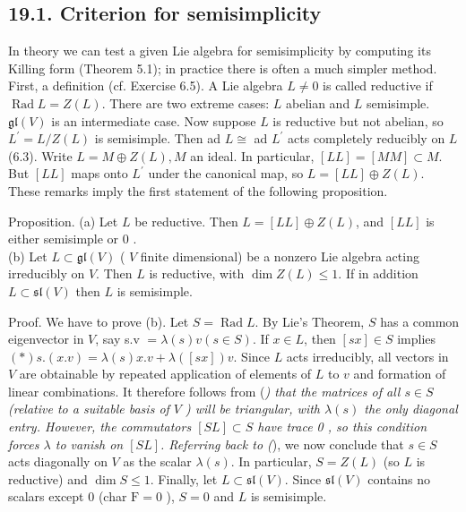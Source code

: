 \documentclass[10pt]{article}
\begin{document}
\subsection*{19.1. Criterion for semisimplicity}
In theory we can test a given Lie algebra for semisimplicity by computing its Killing form (Theorem 5.1); in practice there is often a much simpler method. First, a definition (cf. Exercise 6.5). A Lie algebra $L \neq 0$ is called reductive if $\operatorname{Rad} L=Z(L)$. There are two extreme cases: $L$ abelian and $L$ semisimple. $\mathfrak{g l}(V)$ is an intermediate case. Now suppose $L$ is reductive but not abelian, so $L^{\prime}=L / Z(L)$ is semisimple. Then ad $L \cong$ ad $L^{\prime}$ acts completely reducibly on $L$ (6.3). Write $L=M \oplus Z(L), M$ an ideal. In particular, $[L L]=[M M] \subset M$. But $[L L]$ maps onto $L^{\prime}$ under the canonical map, so $L=[L L] \oplus Z(L)$. These remarks imply the first statement of the following proposition.

Proposition. (a) Let $L$ be reductive. Then $L=[L L] \oplus Z(L)$, and $[L L]$ is either semisimple or 0 .\\
(b) Let $L \subset \mathfrak{g l}(V)$ ( $V$ finite dimensional) be a nonzero Lie algebra acting irreducibly on $V$. Then $L$ is reductive, with $\operatorname{dim} Z(L) \leq 1$. If in addition $L \subset \mathfrak{s l}(V)$ then $L$ is semisimple.

Proof. We have to prove (b). Let $S=\operatorname{Rad} L$. By Lie's Theorem, $S$ has a common eigenvector in $V$, say s.v $=\lambda(s) v(s \in S)$. If $x \in L$, then $[s x] \in S$ implies $(*) s .(x . v)=\lambda(s) x . v+\lambda([s x]) v$. Since $L$ acts irreducibly, all vectors in $V$ are obtainable by repeated application of elements of $L$ to $v$ and formation of linear combinations. It therefore follows from (\textit{) that the matrices of all $s \in S$ (relative to a suitable basis of $V$ ) will be triangular, with $\lambda(s)$ the only diagonal entry. However, the commutators $[S L] \subset S$ have trace 0 , so this condition forces $\lambda$ to vanish on $[S L]$. Referring back to (}), we now conclude that $s \in S$ acts diagonally on $V$ as the scalar $\lambda(s)$. In particular, $S=Z(L)$ (so $L$ is reductive) and $\operatorname{dim} S \leq 1$. Finally, let $L \subset \mathfrak{s l}(V)$. Since $\mathfrak{s l}(V)$ contains no scalars except 0 (char $\mathrm{F}=0$ ), $S=0$ and $L$ is semisimple.
\end{document}
